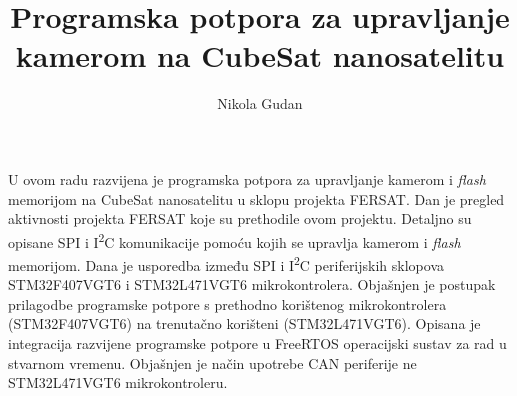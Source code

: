 \documentclass[times, utf8, zavrsni, numeric]{fer}
\begin{document}

\title{Programska potpora za upravljanje kamerom na CubeSat nanosatelitu}

\author{Nikola Gudan}

\maketitle

\izvornik


\tableofcontents











\begin{sazetak}
U ovom radu razvijena je programska potpora za upravljanje kamerom i \textit{flash} memorijom na CubeSat nanosatelitu u sklopu projekta FERSAT. Dan je pregled aktivnosti projekta FERSAT koje su prethodile ovom projektu. Detaljno su opisane SPI i I\textsuperscript{2}C komunikacije pomoću kojih se upravlja kamerom i \textit{flash} memorijom. Dana je usporedba između SPI i I\textsuperscript{2}C periferijskih sklopova STM32F407VGT6 i STM32L471VGT6 mikrokontrolera. Objašnjen je postupak prilagodbe programske potpore s prethodno korištenog mikrokontrolera (STM32F407VGT6) na trenutačno korišteni (STM32L471VGT6). Opisana je integracija razvijene programske potpore u FreeRTOS operacijski sustav za rad u stvarnom vremenu. Objašnjen je način upotrebe CAN periferije ne STM32L471VGT6 mikrokontroleru.

\end{sazetak}
\end{document}
